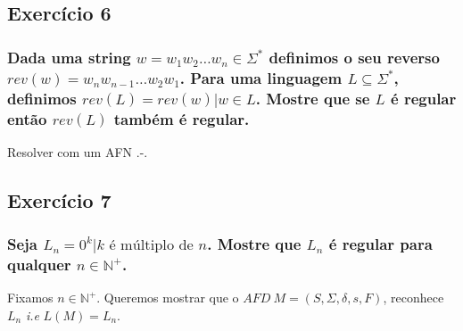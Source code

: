 \documentclass{article}
\begin{document}
\subsection*{Exercício 6}
\subsubsection*{Dada uma string $w = w_1w_2\dots w_n \in \Sigma^\ast$ definimos o seu reverso $rev(w) = w_{n}w_{n-1}\dots w_2w_1$. Para uma linguagem $L \subseteq \Sigma^\ast$, definimos $rev(L) = {rev(w) | w \in L}$. Mostre que se $L$ é regular então $rev(L)$ também é regular.}

Resolver com um AFN .-.


\subsection*{Exercício 7}
\subsubsection*{Seja $L_n = {0^k | k \textrm{ é múltiplo de }n}$. Mostre que $L_n$ é regular para qualquer $n \in \mathbb{N}^+$.}

Fixamos $n \in \mathbb{N}^+$. Queremos mostrar que o $AFD \ M = (S,\Sigma,\delta,s,F)$, reconhece $L_n$ \textit{i.e} $L(M) = L_n$.

\begin{center}
\end{center}
\end{document}
